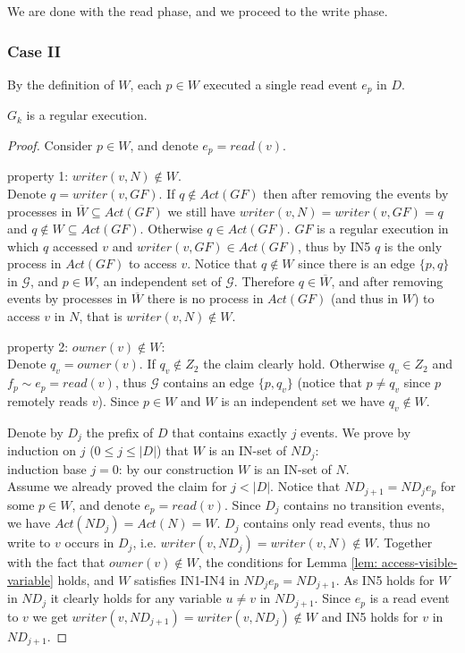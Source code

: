 We are done with the read phase, and we proceed to the write phase.

\subsubsection*{\hspace{5mm} Case II}
By the definition of $W$, each $p \in W$ executed a single read event $e_p$ in $D$.

\begin{claim-subsection} \label{claim: G_k-is-regular}
	$G_k$ is a regular execution.
\end{claim-subsection}

\begin{proof}	
	Consider $p \in W$, and denote $e_p = read(v)$.
	
	property 1: $writer(v,N) \notin W$.
	\\ Denote $q = writer(v, G F)$. If $q \notin Act (G F)$ then after removing the events by processes in $\overline{W} \subseteq Act(G F)$ we still have $writer(v,N) = writer(v,G F) = q$ and $q \notin W \subseteq Act(G F)$. Otherwise  $q \in Act(G F)$. $G F$ is a regular execution in which $q$ accessed $v$ and $writer(v, G F) \in Act(G F)$, thus by IN5 $q$ is the only process in $Act(G F)$ to access $v$. Notice that $q \notin W$ since there is an edge $\{p,q\}$ in $\mathcal{G}$, and $p \in W$, an independent set of $\mathcal{G}$. Therefore $q \in \overline{W}$, and after removing events by processes in $\overline{W}$ there is no process in $Act(G F)$ (and thus in $W$) to access $v$ in $N$, that is $writer(v,N) \notin W$.
	
	property 2: $owner(v) \notin W$:
	\\ Denote $q_v = owner(v)$. If $q_v \notin Z_2$ the claim clearly hold. Otherwise $q_v \in Z_2$ and $f_p \sim e_p = read(v)$, thus $\mathcal{G}$ contains an edge $\{p,q_v\}$ (notice that $p \neq q_v$ since $p$ remotely reads $v$). Since $p \in W$ and $W$ is an independent set we have $q_v \notin W$.
	
	Denote by $D_j$ the prefix of $D$ that contains exactly $j$ events. We prove by induction on $j$ ($0 \leq j \leq |D|$) that $W$ is an IN-set of $N D_j$:
	\\ induction base $j=0$: by our construction $W$ is an IN-set of $N$.
	\\ Assume we already proved the claim for $j < |D|$. Notice that $N D_{j+1} = N D_j e_p$ for some $p \in W$, and denote $e_p = read(v)$. Since $D_j$ contains no transition events, we have $Act(N D_j) = Act(N) = W$. $D_j$ contains only read events, thus no write to $v$ occurs in $D_j$, i.e. $writer(v, N D_j) = writer(v, N) \notin W$. Together with the fact that $owner(v) \notin W$, the conditions for Lemma \ref{lem: access-visible-variable} holds, and $W$ satisfies IN1-IN4 in $N D_j e_p = N D_{j+1}$. As IN5 holds for $W$ in $N D_j$ it clearly holds for any variable $u \neq v$ in $N D_{j+1}$. Since $e_p$ is a read event to $v$ we get $writer(v, N D_{j+1}) = writer(v, N D_j) \notin W$ and IN5 holds for $v$ in $N D_{j+1}$.
	

\end{proof}

